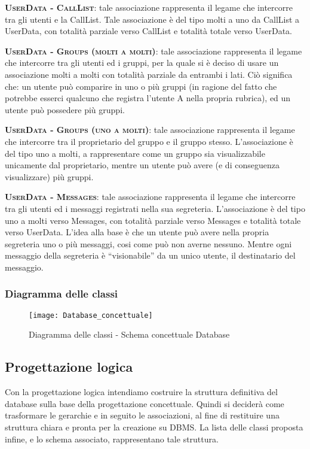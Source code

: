 \begin{description}
	\item{\scshape\bfseries UserData - CallList}: tale associazione rappresenta il legame che intercorre tra gli utenti e la CallList. Tale associazione è del tipo molti a uno da CallList a UserData, con totalità parziale verso CallList e totalità totale verso UserData.
	\item{\scshape\bfseries UserData - Groups (molti a molti)}: tale associazione rappresenta il legame che intercorre tra gli utenti ed i gruppi, per la quale si è deciso di usare un associazione molti a molti con totalità parziale da entrambi i lati. Ciò significa che: un utente può comparire in uno o più gruppi (in ragione del fatto che potrebbe esserci qualcuno che registra l'utente A nella propria rubrica), ed un utente può possedere più gruppi.
	\item{\scshape\bfseries UserData - Groups (uno a molti)}: tale associazione rappresenta il legame che intercorre tra il proprietario del gruppo e il gruppo stesso. L'associazione è del tipo uno a molti, a rappresentare come un gruppo sia visualizzabile unicamente dal proprietario, mentre un utente può avere (e di conseguenza visualizzare) più gruppi.
	\item{\scshape\bfseries UserData - Messages}: tale associazione rappresenta il legame che intercorre tra gli utenti ed i messaggi registrati nella sua segreteria. L'associazione è del tipo uno a molti verso Messages, con totalità parziale verso Messages e totalità totale verso UserData. L'idea alla base è che un utente può avere nella propria segreteria uno o più messaggi, cosi come può non averne nessuno. Mentre ogni messaggio della segreteria è ``visionabile'' da un unico utente, il destinatario del messaggio.
\end{description}

\subsubsection{Diagramma delle classi}
\begin{figure}[H]
\begin{center}
\texttt{[image: Database\_concettuale]}
\caption{Diagramma delle classi - Schema concettuale Database}\label{fig:database_concettuale}
\end{center}
\end{figure}

\subsection{Progettazione logica}
Con la progettazione logica intendiamo costruire la struttura definitiva del database sulla base della progettazione concettuale. Quindi si deciderà come trasformare le gerarchie e in seguito le associazioni, al fine di restituire una struttura chiara e pronta per la creazione su DBMS. La lista delle classi proposta infine, e lo schema associato, rappresentano tale struttura.

